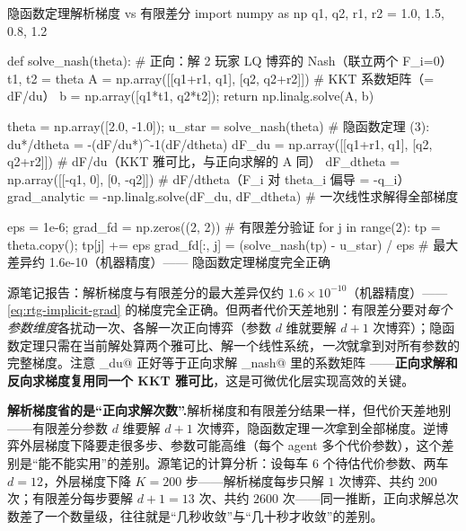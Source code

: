 \begin{codebox}[Python]{隐函数定理解析梯度 vs 有限差分}
import numpy as np
q1, q2, r1, r2 = 1.0, 1.5, 0.8, 1.2

def solve_nash(theta):                              # 正向：解 2 玩家 LQ 博弈的 Nash（联立两个 F_i=0）
    t1, t2 = theta
    A = np.array([[q1+r1, q1], [q2, q2+r2]])        # KKT 系数矩阵（= dF/du）
    b = np.array([q1*t1, q2*t2]); return np.linalg.solve(A, b)

theta = np.array([2.0, -1.0]); u_star = solve_nash(theta)
# 隐函数定理 (3): du*/dtheta = -(dF/du*)^{-1}(dF/dtheta)
dF_du     = np.array([[q1+r1, q1], [q2, q2+r2]])    # dF/du（KKT 雅可比，与正向求解的 A 同）
dF_dtheta = np.array([[-q1, 0], [0, -q2]])          # dF/dtheta（F_i 对 theta_i 偏导 = -q_i）
grad_analytic = -np.linalg.solve(dF_du, dF_dtheta) # 一次线性求解得全部梯度

eps = 1e-6; grad_fd = np.zeros((2, 2))             # 有限差分验证
for j in range(2):
    tp = theta.copy(); tp[j] += eps
    grad_fd[:, j] = (solve_nash(tp) - u_star) / eps
# 最大差异约 1.6e-10（机器精度）—— 隐函数定理梯度完全正确
\end{codebox}

\noindent 源笔记报告：解析梯度与有限差分的最大差异仅约 $1.6\times10^{-10}$（机器精度）——\cref{eq:rtg-implicit-grad} 的梯度完全正确\cite{peters2021inferring}。但两者代价天差地别：有限差分要对\emph{每个参数维度}各扰动一次、各解一次正向博弈（参数 $d$ 维就要解 $d+1$ 次博弈）；隐函数定理只需在当前解处算两个雅可比、解一个线性系统，\emph{一次}就拿到对所有参数的完整梯度。注意 \verb@dF_du@ 正好等于正向求解 \verb@solve_nash@ 里的系数矩阵 \verb@A@——\textbf{正向求解和反向求梯度复用同一个 KKT 雅可比}，这是可微优化层实现高效的关键。

\begin{insight}
\textbf{解析梯度省的是“正向求解次数”.}\;解析梯度和有限差分结果一样，但代价天差地别——有限差分参数 $d$ 维要解 $d+1$ 次博弈，隐函数定理\emph{一次}拿到全部梯度。逆博弈外层梯度下降要走很多步、参数可能高维（每个 agent 多个代价参数），这个差别是“能不能实用”的差别。源笔记的计算分析：设每车 $6$ 个待估代价参数、两车 $d=12$，外层梯度下降 $K=200$ 步——解析梯度每步只解 $1$ 次博弈、共约 $200$ 次；有限差分每步要解 $d+1=13$ 次、共约 $2600$ 次——同一推断，正向求解总次数差了一个数量级，往往就是“几秒收敛”与“几十秒才收敛”的差别。
\end{insight}


